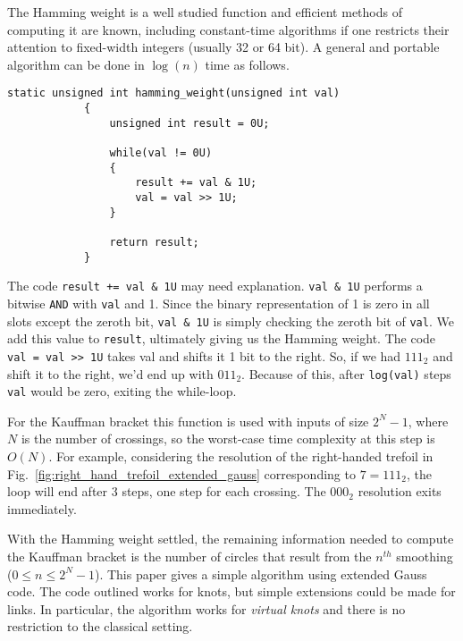 \documentclass{article}
\theoremstyle{plain}
\begin{document}
        The Hamming weight is a well studied function and efficient methods of
        computing it are known, including constant-time algorithms if one
        restricts their attention to fixed-width integers
        (usually 32 or 64 bit). A general and portable algorithm can be done in
        $\log(n)$ time as follows.
        \begin{lstlisting}[style=CStyle, gobble=12]
            static unsigned int hamming_weight(unsigned int val)
            {
                unsigned int result = 0U;

                while(val != 0U)
                {
                    result += val & 1U;
                    val = val >> 1U;
                }

                return result;
            }
        \end{lstlisting}
        The code \texttt{result += val \& 1U} may need explanation.
        \texttt{val \& 1U} performs a bitwise \texttt{AND} with \texttt{val} and
        1. Since the binary representation of 1 is zero in all slots except the
        zeroth bit, \texttt{val \& 1U} is simply checking the zeroth bit of
        \texttt{val}. We add this value to \texttt{result}, ultimately giving
        us the Hamming weight. The code \texttt{val = val >> 1U} takes val and
        shifts it 1 bit to the right. So, if we had $111_{2}$ and shift it to
        the right, we'd end up with $011_{2}$. Because of this, after
        \texttt{log(val)} steps \texttt{val} would be zero, exiting the
        while-loop.
        \par\hfill\par
        For the Kauffman bracket this function is used with inputs of size
        $2^{N}-1$, where $N$ is the number of crossings, so the worst-case
        time complexity at this step is $O(N)$. For example, considering the
        resolution of the right-handed trefoil
        in Fig.~\ref{fig:right_hand_trefoil_extended_gauss} corresponding to
        $7=111_{2}$, the loop will end after 3 steps, one step for each
        crossing. The $000_{2}$ resolution exits immediately.
        \par\hfill\par
        With the Hamming weight settled, the remaining information needed to
        compute the Kauffman bracket is the number of circles that result from
        the $n^{th}$ smoothing ($0\leq{n}\leq{2}^{N}-1$). This paper gives a
        simple algorithm using extended Gauss code. The code outlined works for
        knots, but simple extensions could be made for links. In particular, the
        algorithm works for \textit{virtual knots} and there is no restriction
        to the classical setting.
\end{document}
